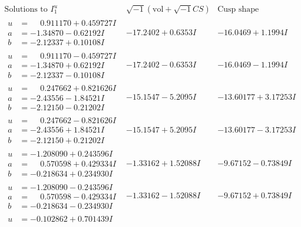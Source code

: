 \documentclass[1p]{elsarticle_modified}
\theoremstyle{definition}
\newcommand{\I}{\sqrt{-1}}
\begin{document}
$$\begin{array}{c|c|c}  
\text{Solutions to }I^u_{1}& \I (\text{vol} + \sqrt{-1}CS) & \text{Cusp shape}\\
 \hline 
\begin{aligned}
u &= \phantom{-}0.911170 + 0.459727 I \\
a &= -1.34870 - 0.62192 I \\
b &= -2.12337 + 0.10108 I\end{aligned}
 & -17.2402 + 0.6353 I & -16.0469 + 1.1994 I \\ \hline\begin{aligned}
u &= \phantom{-}0.911170 - 0.459727 I \\
a &= -1.34870 + 0.62192 I \\
b &= -2.12337 - 0.10108 I\end{aligned}
 & -17.2402 - 0.6353 I & -16.0469 - 1.1994 I \\ \hline\begin{aligned}
u &= \phantom{-}0.247662 + 0.821626 I \\
a &= -2.43556 - 1.84521 I \\
b &= -2.12150 - 0.21202 I\end{aligned}
 & -15.1547 - 5.2095 I & -13.60177 + 3.17253 I \\ \hline\begin{aligned}
u &= \phantom{-}0.247662 - 0.821626 I \\
a &= -2.43556 + 1.84521 I \\
b &= -2.12150 + 0.21202 I\end{aligned}
 & -15.1547 + 5.2095 I & -13.60177 - 3.17253 I \\ \hline\begin{aligned}
u &= -1.208090 + 0.243596 I \\
a &= \phantom{-}0.570598 + 0.429334 I \\
b &= -0.218634 + 0.234930 I\end{aligned}
 & -1.33162 + 1.52088 I & -9.67152 - 0.73849 I \\ \hline\begin{aligned}
u &= -1.208090 - 0.243596 I \\
a &= \phantom{-}0.570598 - 0.429334 I \\
b &= -0.218634 - 0.234930 I\end{aligned}
 & -1.33162 - 1.52088 I & -9.67152 + 0.73849 I \\ \hline\begin{aligned}
u &= -0.102862 + 0.701439 I \\

\end{aligned}
\end{array}$$
\end{document}
